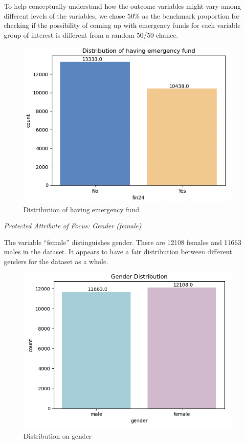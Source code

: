 \documentclass[12pt]{article}
\begin{document}
To help conceptually understand how the outcome variables might vary
among different levels of the variables, we chose 50\% as the benchmark
proportion for checking if the possibility of coming up with emergency
funds for each variable group of interest is different from a random
50/50 chance.

\begin{figure}

{\centering \includegraphics[width=0.7\linewidth]{graphs/f24_graph1} 

}

\caption{Distribution of having emergency fund}\label{fig:unnamed-chunk-4}
\end{figure}

\emph{Protected Attribute of Focus: Gender (female)}

The variable ``female'' distinguishes gender. There are 12108 females
and 11663 males in the dataset. It appears to have a fair distribution
between different genders for the dataset as a whole.

\begin{figure}

{\centering \includegraphics[width=1\linewidth]{graphs/f24_graph2} 

}

\caption{Distribution on gender}\label{fig:unnamed-chunk-5}
\end{figure}
\end{document}
